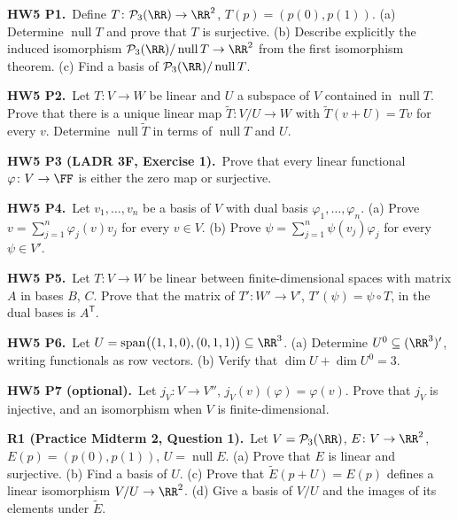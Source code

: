 \documentclass[10pt]{scrartcl}
\DeclareMathOperator{\spn}{span}\DeclareMathOperator{\nul}{null}\DeclareMathOperator{\range}{range}
\newcommand{\PP}{\mathcal P}\newcommand{\LL}{\mathcal L}\newcommand{\MM}{\mathcal M}\newcommand{\T}{\mathsf T}
\newcommand{\Tt}{\widetilde T}
\begin{document}
\begin{prob}\textbf{HW5 P1.}\ Define $T\colon\PP_3(\RR)\to\RR^2$, $T(p)=(p(0),p(1))$. (a) Determine $\nul T$ and prove that $T$ is surjective. (b) Describe explicitly the induced isomorphism $\PP_3(\RR)/\nul T\to\RR^2$ from the first isomorphism theorem. (c) Find a basis of $\PP_3(\RR)/\nul T$.


\end{prob}
\begin{prob}\textbf{HW5 P2.}\ Let $T\colon V\to W$ be linear and $U$ a subspace of $V$ contained in $\nul T$. Prove that there is a unique linear map $\Tt\colon V/U\to W$ with $\Tt(v+U)=Tv$ for every $v$. Determine $\nul\Tt$ in terms of $\nul T$ and $U$.


\end{prob}
\begin{prob}\textbf{HW5 P3 (LADR 3F, Exercise 1).}\ Prove that every linear functional $\varphi\colon V\to\FF$ is either the zero map or surjective.


\end{prob}
\begin{prob}\textbf{HW5 P4.}\ Let $v_1,\dots,v_n$ be a basis of $V$ with dual basis $\varphi_1,\dots,\varphi_n$. (a) Prove $v=\sum_{j=1}^n\varphi_j(v)v_j$ for every $v\in V$. (b) Prove $\psi=\sum_{j=1}^n\psi(v_j)\varphi_j$ for every $\psi\in V'$.


\end{prob}
\begin{prob}\textbf{HW5 P5.}\ Let $T\colon V\to W$ be linear between finite-dimensional spaces with matrix $A$ in bases $B$, $C$. Prove that the matrix of $T'\colon W'\to V'$, $T'(\psi)=\psi\circ T$, in the dual bases is $A^\T$.


\end{prob}
\begin{prob}\textbf{HW5 P6.}\ Let $U=\spn\bigl((1,1,0),(0,1,1)\bigr)\subseteq\RR^3$. (a) Determine $U^0\subseteq(\RR^3)'$, writing functionals as row vectors. (b) Verify that $\dim U+\dim U^0=3$.
\end{prob}
\begin{prob}\textbf{HW5 P7 (optional).}\ Let $j_V\colon V\to V''$, $j_V(v)(\varphi)=\varphi(v)$. Prove that $j_V$ is injective, and an isomorphism when $V$ is finite-dimensional.
\end{prob}
\begin{prob}\textbf{R1 (Practice Midterm 2, Question 1).}\ Let $V=\PP_3(\RR)$, $E\colon V\to\RR^2$, $E(p)=(p(0),p(1))$, $U=\nul E$. (a) Prove that $E$ is linear and surjective. (b) Find a basis of $U$. (c) Prove that $\widetilde E(p+U)=E(p)$ defines a linear isomorphism $V/U\to\RR^2$. (d) Give a basis of $V/U$ and the images of its elements under $\widetilde E$.
\end{prob}
\end{document}
